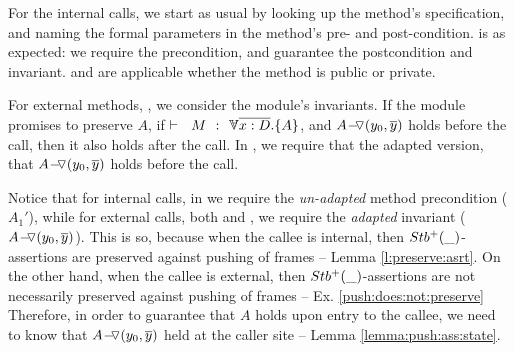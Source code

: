 For the internal calls, we  start as usual by looking up the method's specification, and 
naming the formal   parameters in the method's pre- and post-condition.
  {} is as expected:   we  require the precondition, and guarantee the postcondition and invariant.
 {} and {}  are applicable whether the method is public or private.


For external methods,  {}, we consider the module's invariants. If the module promises to preserve $A$, \ie if  $\promises M   {\TwoStatesN {\overline {x:D}} {A}}$, and   $ \PushASLong {(y_0, \overline y)}{A}$  holds before the call, then it also holds after  the call.
In  {},  we require that the adapted version,  \ie that   $ \PushASLong {(y_0, \overline y)}{A}$ holds before the call. 



\vspace{.1cm}

Notice that %
 for internal calls, in {} we require  the \emph{un-adapted} %
 method  precondition (\ie $A_1'$), while for external calls, both {} and {}, we require the 
 \emph{adapted} %
 invariant (\ie $ \PushASLong {(y_0, \overline y)}{A}$). 
This is so, because when the callee is internal, then  %
 $\Pos{\_}$-assertions are preserved against pushing of frames -- \cf Lemma \ref{l:preserve:asrt}. 
On the other hand, when the callee is external, then $\Pos{\_}$-assertions are not necessarily preserved against pushing of frames -- \cf Ex. \ref{push:does:not:preserve} 
Therefore, in order to guarantee that $A$ holds upon entry to the callee, we need to know that $ \PushASLong {(y_0, \overline y)}{A}$ held at the caller site -- \cf Lemma \ref{lemma:push:ass:state}.

